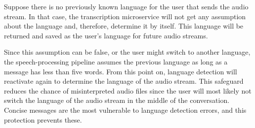 Suppose there is no previously known language for the user that sends the audio stream. In that case, the transcription 
microservice will not get any assumption about the language and, therefore, determine it by itself. This language will 
be returned and saved as the user's language for future audio streams.

Since this assumption can be false, or the user might switch to another language, the speech-processing pipeline 
assumes the previous language as long as a message has less than five words. From this point on, language detection 
will reactivate again to determine the language of the audio stream. This safeguard reduces the chance of 
misinterpreted audio files since the user will most likely not switch the language of the audio stream in the middle 
of the conversation. Concise messages are the most vulnerable to language detection errors, and this protection 
prevents these.

